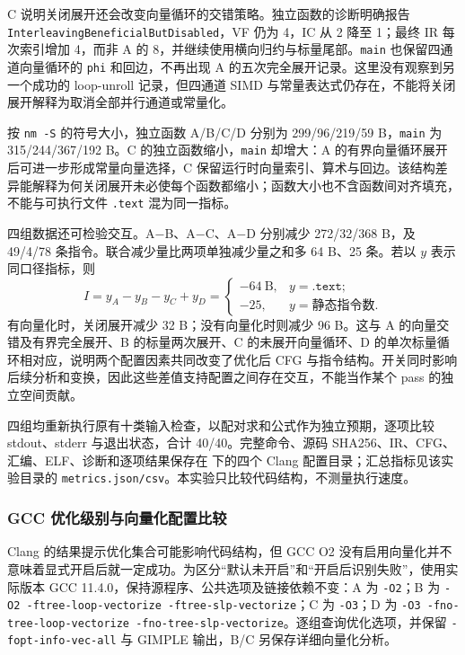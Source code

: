 C 说明关闭展开还会改变向量循环的交错策略。独立函数的诊断明确报告 \texttt{InterleavingBeneficialButDisabled}，VF 仍为 4，IC 从 2 降至 1；最终 IR 每次索引增加 4，而非 A 的 8，并继续使用横向归约与标量尾部。\texttt{main} 也保留四通道向量循环的 \texttt{phi} 和回边，不再出现 A 的五次完全展开记录。这里没有观察到另一个成功的 loop-unroll 记录，但四通道 SIMD 与常量表达式仍存在，不能将关闭展开解释为取消全部并行通道或常量化。

按 \texttt{nm -S} 的符号大小，独立函数 A/B/C/D 分别为 299/96/219/59 B，\texttt{main} 为 315/244/367/192 B。C 的独立函数缩小，\texttt{main} 却增大：A 的有界向量循环展开后可进一步形成常量向量选择，C 保留运行时向量索引、算术与回边。该结构差异能解释为何关闭展开未必使每个函数都缩小；函数大小也不含函数间对齐填充，不能与可执行文件 \texttt{.text} 混为同一指标。

四组数据还可检验交互。A$-$B、A$-$C、A$-$D 分别减少 272/32/368 B，及 49/4/78 条指令。联合减少量比两项单独减少量之和多 64 B、25 条。若以 $y$ 表示同口径指标，则
\[
 I=y_A-y_B-y_C+y_D
   =\begin{cases}-64\ \mathrm{B},& y=\texttt{.text};\\-25,& y=\text{静态指令数}.\end{cases}
\]
有向量化时，关闭展开减少 32 B；没有向量化时则减少 96 B。这与 A 的向量交错及有界完全展开、B 的标量两次展开、C 的未展开向量循环、D 的单次标量循环相对应，说明两个配置因素共同改变了优化后 CFG 与指令结构。开关同时影响后续分析和变换，因此这些差值支持配置之间存在交互，不能当作某个 pass 的独立空间贡献。

四组均重新执行原有十类输入检查，以配对求和公式作为独立预期，逐项比较 stdout、stderr 与退出状态，合计 40/40。完整命令、源码 SHA256、IR、CFG、汇编、ELF、诊断和逐项结果保存在  下的四个 Clang 配置目录；汇总指标见该实验目录的 \texttt{metrics.json/csv}。本实验只比较代码结构，不测量执行速度。

\subsubsection{GCC 优化级别与向量化配置比较}
\label{sec:toolchain-gcc-controlled}
Clang 的结果提示优化集合可能影响代码结构，但 GCC O2 没有启用向量化并不意味着显式开启后就一定成功。为区分“默认未开启”和“开启后识别失败”，使用实际版本 GCC 11.4.0，保持源程序、公共选项及链接依赖不变：A 为 \texttt{-O2}；B 为 \texttt{-O2 -ftree-loop-vectorize -ftree-slp-vectorize}；C 为 \texttt{-O3}；D 为 \texttt{-O3 -fno-tree-loop-vectorize -fno-tree-slp-vectorize}。逐组查询优化选项，并保留 \texttt{-fopt-info-vec-all} 与 GIMPLE 输出，B/C 另保存详细向量化分析。

